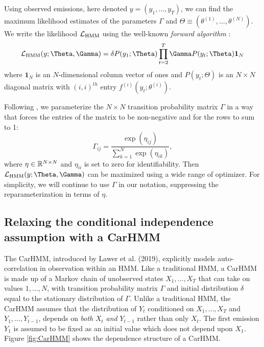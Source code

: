 Using observed emissions, here denoted $y = (y_1,\ldots,y_T)$, we can find the maximum likelihood estimates of the parameters $\Gamma$ and $\Theta \equiv (\theta^{(1)},\ldots,\theta^{(N)})$. We write the likelihood $\mathcal{L}_{\text{HMM}}$ using the  well-known \textit{forward algorithm} \citep{Zucchini:2016}:
%
$$\calL_{\text{HMM}}(y;\Theta,\Gamma) = \delta P(y_1;\Theta) \prod_{t=2}^T \Gamma P(y_t;\Theta) \mathbf{1}_N$$
%
where $\mathbf{1}_N$ is an $N$-dimensional column vector of ones and
%
$P(y_t;\Theta)$ is an $N \times N$ diagonal matrix with $(i,i)^{th}$ entry  $f^{(i)}(y_t; \theta^{(i)})$.
%

Following \citet{Barajas:2017}, we parameterize the $N \times N$ transition probability matrix $\Gamma$ in a way that forces the entries of the matrix to be non-negative and for the rows to sum to 1:
%
\[
\Gamma_{ij} = \frac{\exp(\eta_{ij})}{\sum_{k=1}^N \exp(\eta_{ik})}, 
\]
%
where $\eta \in \mathbb{R}^{N \times N}$ and $\eta_{ii}$ is set to zero for identifiability.  Then $\calL_{\text{HMM}}(y;\Theta,\Gamma)$ can be maximized using a wide range of optimizer.  For simplicity, we will continue to use $\Gamma$ in our notation, suppressing the reparameterization in terms of  $\eta$.


\subsection{Relaxing the conditional independence assumption with a CarHMM}

The CarHMM, introduced by Lawer et al. (2019), explicitly models auto-correlation in observation within an HMM. Like a traditional HMM, a CarHMM is made up of a Markov chain of unobserved states $X_1,\ldots, X_T$ that can take on values $1, \ldots, N$, with transition probability matrix $\Gamma$ and initial distribution $\delta$ equal to the stationary distribution of $\Gamma$. Unlike a traditional HMM, the CarHMM assumes that the distribution of $Y_t$ conditioned on $X_1,\ldots, X_T$ and $Y_1,\ldots, Y_{t-1}$, depends on \textit{both} $X_t$ \textit{and} $Y_{t-1}$ rather than only $X_t$. 
The first emission $Y_1$ is assumed to be fixed as an initial value which does not depend upon $X_1$. Figure \ref{fig:CarHMM} shows the dependence structure of a CarHMM.

